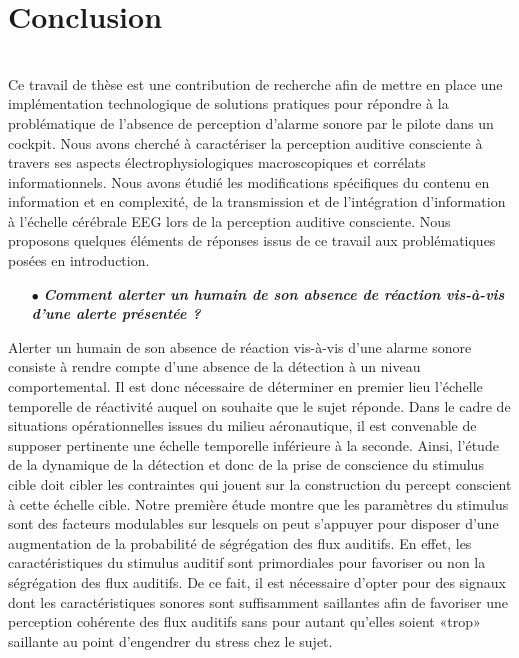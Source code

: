 \chapter*{Conclusion}
\label{chapitre8}

\noindent \hrulefill \\

Ce travail de thèse est une contribution de recherche afin de mettre en place une implémentation technologique de solutions pratiques pour répondre à la problématique de l'absence de perception d'alarme sonore par le pilote dans un cockpit. 
Nous avons cherché à caractériser la perception auditive consciente à travers ses aspects électrophysiologiques macroscopiques et corrélats informationnels.
Nous avons étudié les modifications spécifiques du contenu en information et en complexité, de la transmission et de l'intégration d'information à l'échelle cérébrale EEG lors de la perception auditive consciente. 
Nous proposons quelques éléments de réponses issus de ce travail aux problématiques posées en introduction. \\

\begin{itemize}
\item[$\bullet$] \textit{\textbf{Comment alerter un humain de son absence de réaction vis-à-vis d'une alerte présentée ?}} \\
\end{itemize}

Alerter un humain de son absence de réaction vis-à-vis d'une alarme sonore consiste à rendre compte d'une absence de la détection à un niveau comportemental. 
Il est donc nécessaire de déterminer en premier lieu l'échelle temporelle de réactivité auquel on souhaite que le sujet réponde. 
Dans le cadre de situations opérationnelles issues du milieu aéronautique, il est convenable de supposer pertinente une échelle temporelle inférieure à la seconde. 
Ainsi, l'étude de la dynamique de la détection et donc de la prise de conscience du stimulus cible doit cibler les contraintes qui jouent sur la construction du percept conscient à cette échelle cible. 
Notre première étude montre que les paramètres du stimulus sont des facteurs modulables sur lesquels on peut s'appuyer pour disposer d'une augmentation de la probabilité de ségrégation des flux auditifs. 
En effet, les caractéristiques du stimulus auditif sont primordiales pour favoriser ou non la ségrégation des flux auditifs. 
De ce fait, il est nécessaire d'opter pour des signaux dont les caractéristiques sonores sont suffisamment saillantes afin de favoriser une perception cohérente des flux auditifs sans pour autant qu'elles soient «trop» saillante au point d'engendrer du stress chez le sujet. 

